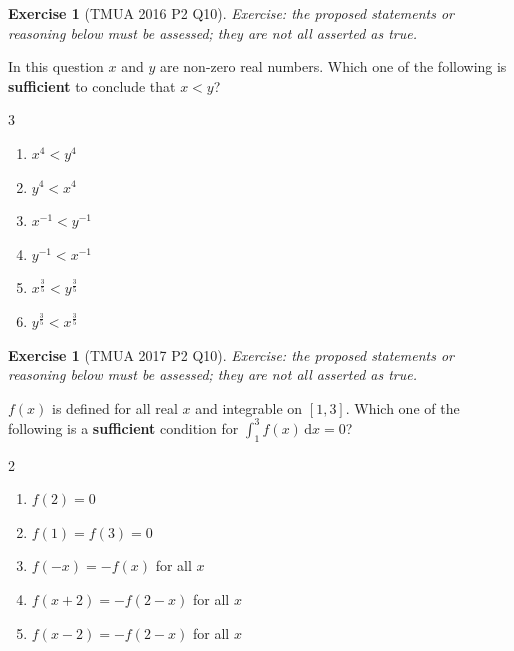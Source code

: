 \documentclass[11pt]{article}
\theoremstyle{definition}
\newtheorem{example}[theorem]{Exercise}
\theoremstyle{remark}
\newcommand{\pqty}[1]{\left(#1\right)}
\newcommand{\flatfrac}[2]{\frac{#1}{#2}}
\newcommand{\inverse}{^{-1}}
\newcommand{\dd}[1]{\,\mathrm{d}#1}
\begin{document}
\begin{example}[TMUA 2016 P2 Q10]\label{tmua-6-unit-007}
\textit{Exercise: the proposed statements or reasoning below must be assessed; they are not all asserted as true.}\par

    In this question \(x\) and \(y\) are non-zero real numbers. Which one of the following is \textbf{sufficient} to conclude that \(x < y\)?
    
    \begin{multicols}{3}
        \begin{enumerate}[label=\Alph*.]
            \item \(x^4 < y^4\)
            \item \(y^4 < x^4\)
            \item \(x\inverse < y\inverse\)
            \item \(y\inverse < x\inverse\)
            \item \(x^{\flatfrac{3}{5}} < y^{\flatfrac{3}{5}}\)
            \item \(y^{\flatfrac{3}{5}} < x^{\flatfrac{3}{5}}\)
        \end{enumerate}
    \end{multicols}
\end{example}

\begin{example}[TMUA 2017 P2 Q10]\label{tmua-6-unit-008}
\textit{Exercise: the proposed statements or reasoning below must be assessed; they are not all asserted as true.}\par

    \(f\pqty{x}\) is defined for all real \(x\) and integrable on \([1,3]\). Which one of the following is a \textbf{sufficient} condition for \(\int_1^3 f\pqty{x} \dd{x} = 0\)?

    \begin{multicols}{2}
        \begin{enumerate}[label=\Alph*.]
            \item \(f\pqty{2} = 0\)
            \item \(f\pqty{1} = f\pqty{3} = 0\)
            \item \(f\pqty{-x} = - f\pqty{x}\) for all \(x\)
            \item \(f\pqty{x + 2} = - f\pqty{2 - x}\) for all \(x\)
            \item \(f\pqty{x - 2} = - f\pqty{2 - x}\) for all \(x\)
        \end{enumerate}
    \end{multicols}
\end{example}
\end{document}
